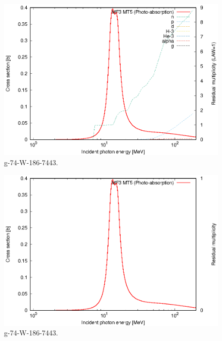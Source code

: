 \begin{figure}
 \includegraphics[width=\linewidth]{eps/g_74-W-186_7443.eps}
  \caption{g-74-W-186-7443.}
\end{figure}
\begin{figure}
 \includegraphics[width=\linewidth]{eps-law0/g_74-W-186_7443.eps}
 \caption{g-74-W-186-7443.}
\end{figure}
\newpage \clearpage

